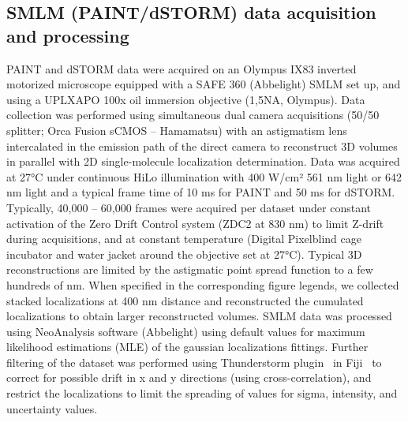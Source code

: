 \subsection{SMLM (PAINT/dSTORM) data acquisition and processing}

PAINT and dSTORM data were acquired on an Olympus IX83 inverted motorized microscope equipped with a SAFE 360 (Abbelight) SMLM set up, and using a UPLXAPO 100x oil immersion objective (1,5NA, Olympus\texttrademark).
Data collection was performed using simultaneous dual camera acquisitions (50/50 splitter; Orca Fusion sCMOS -- Hamamatsu\texttrademark) with an astigmatism lens intercalated in the emission path of the direct camera to reconstruct 3D volumes in parallel with 2D single-molecule localization determination.
Data was acquired at \ang{27}C under continuous HiLo illumination with 400 W/cm² 561 nm light or 642 nm light and a typical frame time of 10 ms for PAINT and 50 ms for dSTORM.
Typically, 40,000 -- 60,000 frames were acquired per dataset under constant activation of the Zero Drift Control system (ZDC2 at 830 nm) to limit Z-drift during acquisitions, and at constant temperature (Digital Pixel\texttrademark blind cage incubator and water jacket around the objective set at \ang{27}C).
Typical 3D reconstructions are limited by the astigmatic point spread function to a few hundreds of nm.
When specified in the corresponding figure legends, we collected stacked localizations at 400 nm distance and reconstructed the cumulated localizations to obtain larger reconstructed volumes.
SMLM data was processed using NeoAnalysis software (Abbelight\texttrademark) using default values for maximum likelihood estimations (MLE) of the gaussian localizations fittings.
Further filtering of the dataset was performed using Thunderstorm plugin~\cite{ovesnyThunderSTORMComprehensiveImageJ2014} in Fiji~\cite{schindelinFijiOpensourcePlatform2012} to correct for possible drift in x and y directions (using cross-correlation), and restrict the localizations to limit the spreading of values for sigma, intensity, and uncertainty values.

